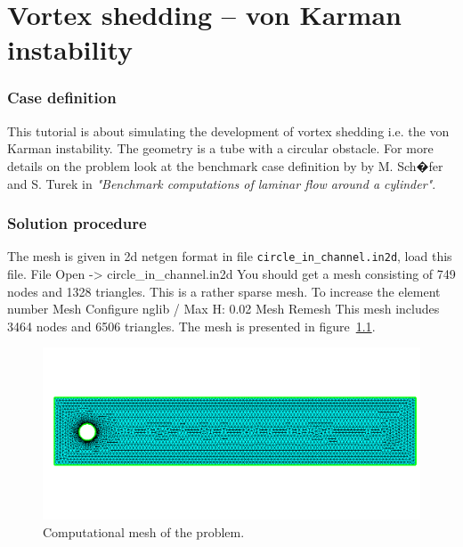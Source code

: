 \chapter{Vortex shedding -- von Karman instability}


\subsection*{Case definition}

This tutorial is about simulating the development of vortex shedding i.e. the von Karman instability. 
The geometry is a tube with a circular obstacle. 
For more details on the problem look at the benchmark case definition by
by M. Sch�fer and S. Turek in \textit{"Benchmark computations of laminar flow around a cylinder"}.


\subsection*{Solution procedure}

The mesh is given in 2d netgen format in file \texttt{circle\_in\_channel.in2d}, load this file.
\ttbegin
File 
  Open -> circle_in_channel.in2d
\ttend
You should get a mesh consisting of 749 nodes and 1328 triangles. This
is a rather sparse mesh. To increase the element number 
\ttbegin
Mesh 
 Configure
   nglib / Max H: 0.02
Mesh 
  Remesh
\ttend
This mesh includes 3464 nodes and 6506 triangles. The mesh is presented in figure~\ref{fg:vonkarman_mesh}.

\begin{figure}[h]
\centering
\includegraphics[width=150 mm, height=55 mm]{vonkarman_mesh}
\caption{Computational mesh of the problem.}\label{fg:vonkarman_mesh}
\end{figure}  


